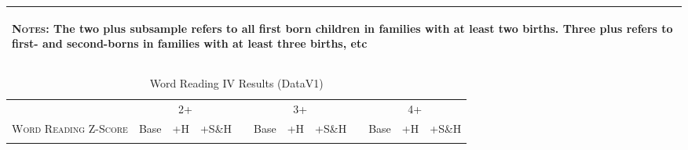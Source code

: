 \begin{landscape}
\begin{table}[htpb!]
\begin{center}
\begin{tabular}{lcccp{2mm}cccp{2mm}ccc}
\midrule\multicolumn{12}{p{19.2cm}}{\begin{footnotesize}\textsc{Notes:} The two plus subsample refers to all first born children in families with at least two births.  Three plus refers to first- and second-borns in families with at least three births, etc\end{footnotesize}} \\ \bottomrule 
\end{tabular}\end{center}\end{table}\end{landscape}\begin{landscape}\begin{table}[htpb!]\caption{Word Reading IV Results (DataV1)}
\label{TWINtab:IVAll}
\begin{center}\begin{tabular}{lcccp{2mm}cccp{2mm}ccc}
\toprule \toprule 
&\multicolumn{3}{c}{2+}&&\multicolumn{3}{c}{3+}&&\multicolumn{3}{c}{4+}\\ \cmidrule(r){2-4} \cmidrule(r){6-8} \cmidrule(r){10-12} 
\textsc{Word Reading Z-Score}&Base&+H&+S\&H&&Base&+H&+S\&H&&Base&+H&+S\&H\\ \midrule 
\begin{footnotesize}\end{footnotesize}& 
\begin{footnotesize}\end{footnotesize}& 
\begin{footnotesize}\end{footnotesize}& 
\begin{footnotesize}\end{footnotesize}& 
\begin{footnotesize}\end{footnotesize}& 
\begin{footnotesize}\end{footnotesize}& 
\begin{footnotesize}\end{footnotesize}& 
\begin{footnotesize}\end{footnotesize}& 
\begin{footnotesize}\end{footnotesize}& 
\begin{footnotesize}\end{footnotesize}& 
\begin{footnotesize}\end{footnotesize}& 
\begin{footnotesize}\end{footnotesize}\\ 

\end{tabular}
\end{center}
\end{table}
\end{landscape}
